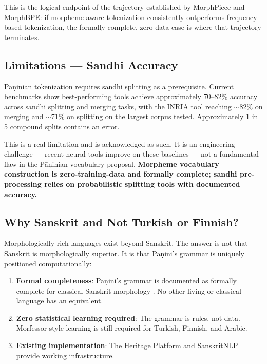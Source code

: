 \documentclass[11pt]{article}
\begin{document}
This is the logical endpoint of the trajectory established by MorphPiece and MorphBPE: if morpheme-aware tokenization consistently outperforms frequency-based tokenization, the formally complete, zero-data case is where that trajectory terminates.

\subsection{Limitations --- Sandhi Accuracy}

P\={a}\d{n}inian tokenization requires sandhi splitting as a prerequisite. Current benchmarks \citep{bhardwaj2018} show best-performing tools achieve approximately 70--82\% accuracy across sandhi splitting and merging tasks, with the INRIA tool reaching $\sim$82\% on merging and $\sim$71\% on splitting on the largest corpus tested. Approximately 1 in 5 compound splits contains an error.

This is a real limitation and is acknowledged as such. It is an engineering challenge --- recent neural tools \citep{sandhan2022} improve on these baselines --- not a fundamental flaw in the P\={a}\d{n}inian vocabulary proposal. \textbf{Morpheme vocabulary construction is zero-training-data and formally complete; sandhi pre-processing relies on probabilistic splitting tools with documented accuracy.}

\subsection{Why Sanskrit and Not Turkish or Finnish?}

Morphologically rich languages exist beyond Sanskrit. The answer is not that Sanskrit is morphologically superior. It is that P\={a}\d{n}ini's grammar is uniquely positioned computationally:

\begin{enumerate}
    \item \textbf{Formal completeness}: P\={a}\d{n}ini's grammar is documented as formally complete for classical Sanskrit morphology \citep{kiparsky2009,huet2008}. No other living or classical language has an equivalent.
    \item \textbf{Zero statistical learning required}: The grammar is rules, not data. Morfessor-style learning is still required for Turkish, Finnish, and Arabic.
    \item \textbf{Existing implementation}: The Heritage Platform \citep{huet2008} and SanskritNLP provide working infrastructure.
\end{enumerate}
\end{document}
